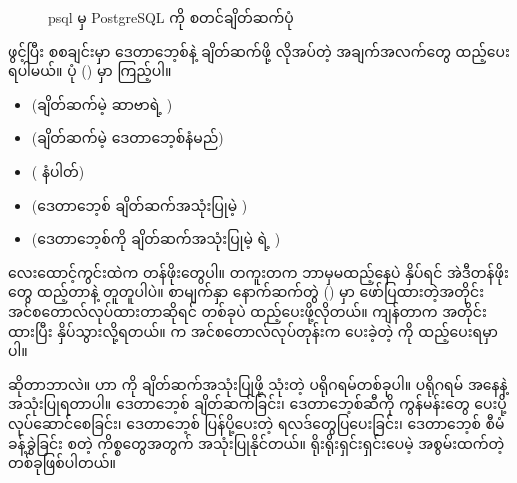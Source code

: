 \begin{figure}[tbh!]
\caption{psql မှ PostgreSQL ကို  စတင်ချိတ်ဆက်ပုံ} 
\label{fig:psqlconnect}
\end{figure}

 ဖွင့်ပြီး စစချင်းမှာ ဒေတာဘေ့စ်နဲ့ ချိတ်ဆက်ဖို့ လိုအပ်တဲ့ အချက်အလက်တွေ ထည့်ပေးရပါမယ်။ ပုံ (\fRefNo{\ref{fig:psqlconnect}}) မှာ ကြည့်ပါ။ 
%
\begin{itemize}
\item {} (ချိတ်ဆက်မဲ့ ဆာဗာရဲ့ )
\item {} (ချိတ်ဆက်မဲ့ ဒေတာဘေ့စ်နံမည်)
\item {} ( နံပါတ်)
\item {} (ဒေတာဘေ့စ် ချိတ်ဆက်အသုံးပြုမဲ့ )
\item {} (ဒေတာဘေ့စ်ကို ချိတ်ဆက်အသုံးပြုမဲ့  ရဲ့ )
\end{itemize}
%

လေးထောင့်ကွင်းထဲက  တန်ဖိုးတွေပါ။ တကူးတက ဘာမှမထည့်နေပဲ  နှိပ်ရင် အဲဒီတန်ဖိုးတွေ ထည့်တာနဲ့ တူတူပါပဲ။ စာမျက်နှာ \fRefNo{\pageref{apdx3}} နောက်ဆက်တွဲ (\fRefNo{\ref{apdx3}}) မှာ ဖော်ပြထားတဲ့အတိုင်း အင်စတောလ်လုပ်ထားတာဆိုရင်  တစ်ခုပဲ ထည့်ပေးဖို့လိုတယ်။ ကျန်တာက  အတိုင်းထားပြီး  နှိပ်သွားလို့ရတယ်။  က အင်စတောလ်လုပ်တုန်းက ပေးခဲ့တဲ့  ကို ထည့်ပေးရမှာပါ။

 ဆိုတာဘာလဲ။  ဟာ  ကို ချိတ်ဆက်အသုံးပြုဖို့ သုံးတဲ့  ပရိုဂရမ်တစ်ခုပါ။  ပရိုဂရမ် အနေနဲ့ အသုံးပြုရတာပါ။ ဒေတာဘေ့စ် ချိတ်ဆက်ခြင်း၊ ဒေတာဘေ့စ်ဆီကို  ကွန်မန်းတွေ ပေးပို့လုပ်ဆောင်စေခြင်း၊ ဒေတာဘေ့စ် ပြန်ပို့ပေးတဲ့ ရလဒ်တွေပြပေးခြင်း၊ ဒေတာဘေ့စ် စီမံခန့်ခွဲခြင်း  စတဲ့ ကိစ္စတွေအတွက် အသုံးပြုနိုင်တယ်။ ရိုးရိုးရှင်းရှင်းပေမဲ့ အစွမ်းထက်တဲ့  တစ်ခုဖြစ်ပါတယ်။

